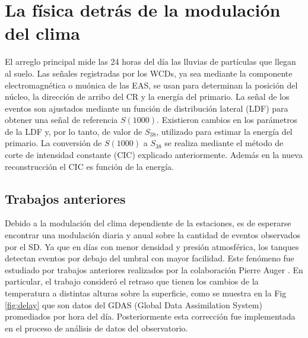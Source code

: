 
\section{La física detrás de la modulación del clima}\label{seccion:fisica_clima}

El arreglo principal mide las 24 horas del día las lluvias de partículas que llegan al suelo. Las señales registradas por los WCDs, ya sea mediante la componente electromagnética o muónica de las EAS, se usan para determinan la posición del núcleo, la dirección de arribo del CR y la energía del primario. La señal de los eventos son ajustados mediante un función de distribución lateral (LDF) para obtener una señal de referencia $S(1000)$. Existieron cambios en los parámetros de la LDF y, por lo tanto, de valor de $S_{38}$, utilizado para estimar la energía del primario. La conversión de $S(1000)$ a $S_{38}$ se realiza mediante el método de corte de intensidad constante (CIC) explicado anteriormente. Además en la nueva reconstrucción el CIC es función de la energía.

\subsection{Trabajos anteriores}

Debido a la modulación del clima dependiente de la estaciones, es de esperarse encontrar una modulación diaria y anual sobre la cantidad de eventos observados por el SD. Ya que en días con menor densidad y presión atmosférica, los tanques detectan eventos por debajo del umbral con mayor facilidad. Este fenómeno fue estudiado por trabajos anteriores realizados por la colaboración Pierre Auger \cite{aab2017impact} \cite{collaboration2009atmospheric}. En particular, el trabajo \cite{aab2017impact} consideró el retraso que tienen los cambios de  la temperatura a distintas alturas sobre la superficie, como se muestra en la Fig\,\ref{fig:delay} que son datos del GDAS (Global Data Assimilation System) promediados por hora del día. Posteriormente esta corrección fue implementada en el proceso  de análisis de datos del observatorio.


